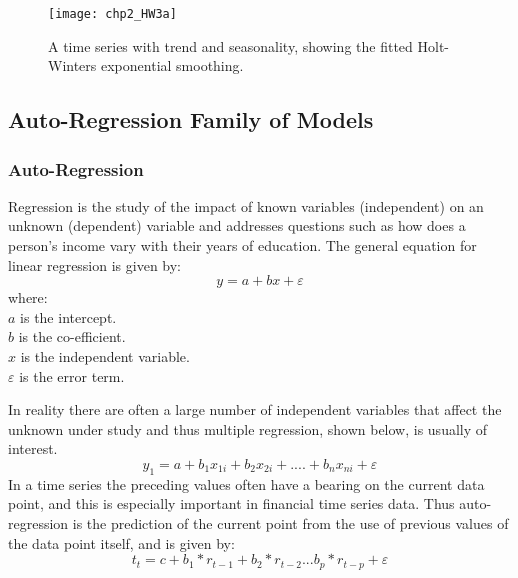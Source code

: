 
\begin{figure}[tbph!]
\centering
\texttt{[image: chp2\_HW3a]}
\caption[Exponential smoothing of a time series with trend and seasonality]{A time series with trend and seasonality, showing the fitted Holt-Winters exponential smoothing.}
\label{fig:HW3a}
\end{figure}



\subsection{Auto-Regression Family of Models}

\subsubsection{Auto-Regression}
\label{sec:autoregression}
Regression is the study of the impact of known variables (independent) on an unknown (dependent) variable and addresses questions such as how does a person's income vary with their years of education. The general equation for linear regression is given by:
\[ y = a + bx + \varepsilon \]
where:\\
$ a $ is the intercept.\\
$ b $ is the co-efficient.\\
$ x $ is the independent variable.\\
$ \varepsilon $ is the error term.

In reality there are often a large number of independent variables that affect the unknown under study and thus multiple regression, shown below, is usually of interest.
\[ y_{1} = a + b_{1}x_{1i} + b_{2}x_{2i} +  ....   +b_{n}x_{ni} + \varepsilon\]
In a time series the preceding values often have a bearing on the current data point, and this is especially important in financial time series data. Thus auto-regression is the prediction of the current point from the use of previous values of the data point itself, and is given by:
\[ t_{t}=c+b_{1}*r_{t-1}+b_{2}*r_{t-2}...b_{p}*r_{t-p}+ \varepsilon \]

